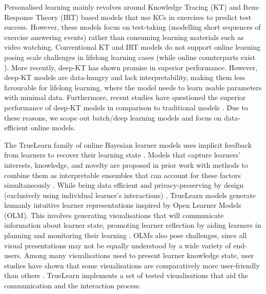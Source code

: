 \documentclass[letterpaper]{article} %
\begin{document}
Personalised learning mainly revolves around Knowledge Tracing (KT) \cite{psych5030050} and Item-Response Theory (IRT) \cite{Rasch1960} based models that use KCs in exercises to predict test success. However, these models focus on test-taking (modelling short sequences of exercise answering events) rather than consuming learning materials such as video watching. Conventional KT and IRT models do not support online learning posing scale challenges in lifelong learning cases (while online counterparts exist \cite{bishopsnewbook}). More recently, deep-KT \cite{deep_kt} has shown promise in superior performance. However, deep-KT models are data-hungry and lack interpretability, making them less favourable for lifelong learning, where the model needs to learn usable parameters with minimal data. Furthermore, recent studies have questioned the superior performance of deep-KT models in comparison to traditional models \cite{Schmucker_Wang_Hu_Mitchell_2022}. Due to these reasons, we scope out batch/deep learning models and focus on data-efficient online models.

The TrueLearn family of online Bayesian learner models uses implicit feedback from learners to recover their learning state \cite{truelearn}. Models that capture learners' interests, knowledge, and novelty are proposed in prior work with methods to combine them as interpretable ensembles that can account for these factors simultaneously \cite{bulathwela2022sus}. 
While being data efficient and privacy-preserving by design 
(exclusively using individual learner's interactions)
, 
TrueLearn models generate humanly intuitive learner representations inspired by Open Learner Models (OLM).
This involves generating visualisations that will communicate information about learner state, promoting learner reflection by aiding learners in planning and monitoring their learning \cite{openlearnermodels}. 
OLMs also pose challenges, since all visual presentations may not be equally understood by a wide variety of end-users. Among many visualisations used to present learner knowledge state, user studies have shown that some visualisations are comparatively more user-friendly than others \cite{10.1007/978-3-319-98572-5_40,visualisationscomparison}. TrueLearn implements a set of tested visualisations that aid the communication and the interaction process. 
\end{document}
